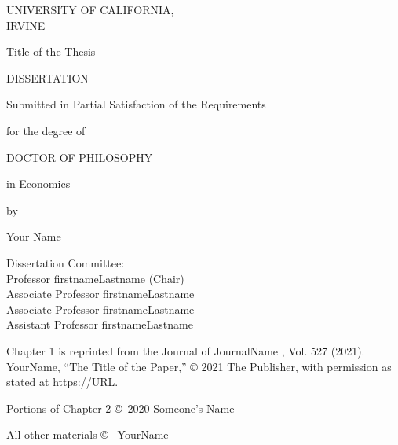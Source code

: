 \documentclass[letterpaper]{report}
\begin{document}
\pagestyle{cover}
\begin{center}

  \vspace*{1.72cm}
  UNIVERSITY OF CALIFORNIA,\\IRVINE
  
  \vspace*{1cm}
  Title of the Thesis
  
  \vspace*{0.25cm}
  DISSERTATION
  
  \vspace*{0.9cm}
  Submitted in Partial Satisfaction of the Requirements
  
  for the degree of
  
  \vspace*{0.73cm}
  DOCTOR OF PHILOSOPHY
  
  \vspace*{0.3cm}
  in Economics
  
  \vspace*{0.9cm}
  by
  
  \vspace*{0.9cm}
  Your Name
\end{center}

\vfill
\begin{flushright}
  Dissertation Committee:\\
  Professor firstnameLastname (Chair)\\
  Associate Professor firstnameLastname\\
  Associate Professor firstnameLastname\\
  Assistant Professor firstnameLastname
\end{flushright}

\vspace*{\fill}
\begin{center}
  \the\year{}
\end{center}

\newpage
\pagestyle{copyright}
\vspace*{\fill}
\begin{center}
  Chapter 1 is reprinted from the Journal of JournalName , Vol. 527 (2021). YourName, ``The Title of the Paper,'' © 2021 The Publisher, with permission as stated at https://URL.
  
  Portions of Chapter 2 \copyright \ 2020 Someone's Name
  
  All other materials \copyright \ \the\year{} YourName
\end{center}
\end{document}
